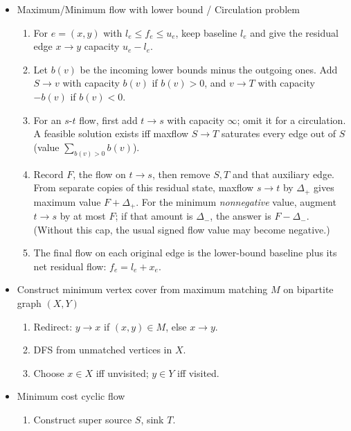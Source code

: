 \begin{itemize}
    \itemsep-0.3em
    \item Maximum/Minimum flow with lower bound / Circulation problem
    \begin{enumerate}
        \itemsep-0.3em
        \item For $e=(x,y)$ with $l_e\le f_e\le u_e$, keep baseline $l_e$ and give the residual edge $x\to y$ capacity $u_e-l_e$.
        \item Let $b(v)$ be the incoming lower bounds minus the outgoing ones. Add $S\to v$ with capacity $b(v)$ if $b(v)>0$, and $v\to T$ with capacity $-b(v)$ if $b(v)<0$.
        \item For an $s$-$t$ flow, first add $t\to s$ with capacity $\infty$; omit it for a circulation. A feasible solution exists iff maxflow $S\to T$ saturates every edge out of $S$ (value $\sum_{b(v)>0}b(v)$).
        \item Record $F$, the flow on $t\to s$, then remove $S,T$ and that auxiliary edge. From separate copies of this residual state, maxflow $s\to t$ by $\Delta_+$ gives maximum value $F+\Delta_+$. For the minimum \emph{nonnegative} value, augment $t\to s$ by at most $F$; if that amount is $\Delta_-$, the answer is $F-\Delta_-$. (Without this cap, the usual signed flow value may become negative.)
        \item The final flow on each original edge is the lower-bound baseline plus its net residual flow: $f_e=l_e+x_e$.
    \end{enumerate}
    \item Construct minimum vertex cover from maximum matching $M$ on bipartite graph $(X, Y)$
    \begin{enumerate}
        \itemsep-0.3em
        \item Redirect: $y \rightarrow x$ if $(x, y) \in M$, else $x \rightarrow y$.
        \item DFS from unmatched vertices in $X$.
        \item Choose $x \in X$ iff unvisited; $y \in Y$ iff visited.
    \end{enumerate}
    \item Minimum cost cyclic flow
    \begin{enumerate}
        \itemsep-0.3em
        \item Construct super source $S$, sink $T$.

\end{enumerate}
\end{itemize}
